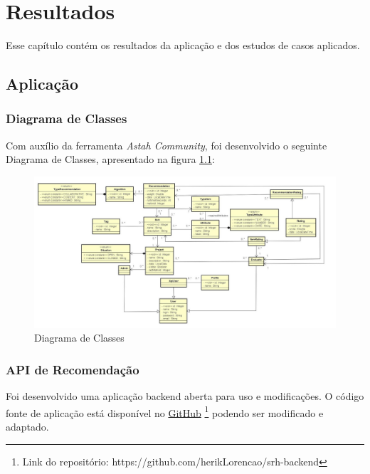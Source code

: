 

\setlength{\afterchapskip}{1.5cm minus \baselineskip}


\chapter{Resultados}
\label{cha:resultados}

Esse capítulo contém os resultados da aplicação e dos estudos de casos aplicados.

\section{Aplicação}

\subsection{Diagrama de Classes}

Com auxílio da ferramenta \textit{Astah Community}, foi desenvolvido o seguinte Diagrama de Classes, apresentado na figura \ref{fig:diagramaClasses}:

\begin{figure}[H]
	\centering
	\includegraphics[width=1\linewidth]{imagens/diagramaClasses.PNG}
	\caption[Diagrama de Classes]{Diagrama de Classes}
    \label{fig:diagramaClasses}
\end{figure}

\subsection{API de Recomendação}

Foi desenvolvido uma aplicação backend aberta para uso e modificações. O código fonte de aplicação está disponível no \href{https://github.com/herikLorencao/srh-backend}{GitHub} \footnote{Link do repositório: https://github.com/herikLorencao/srh-backend} podendo ser modificado e adaptado.

